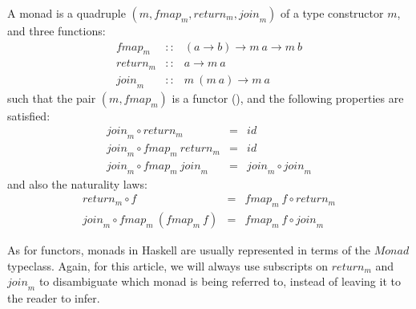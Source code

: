 \begin{definition}\label{defn:monad}
  A monad is a quadruple $(m, \mathit{fmap}_m, \mathit{return}_m,
  \mathit{join}_m)$ of a type constructor $m$, and three functions:
  \begin{displaymath}
    \begin{array}{rcl}
      \mathit{fmap}_m   & :: & (a \to b) \to m~a \to m~b \\
      \mathit{return}_m & :: & a \to m~a \\
      \mathit{join}_m   & :: & m~(m~a) \to m~a
    \end{array}
  \end{displaymath}
  such that the pair $(m, \mathit{fmap}_m)$ is a functor
  (), and the following properties are satisfied:
  \begin{eqnarray}
    \label{eq:monad-join-return}
    \mathit{join}_m \circ \mathit{return}_m & = & \mathit{id} \\
    \label{eq:monad-join-fmap-return}
    \mathit{join}_m \circ \mathit{fmap}_m~\mathit{return}_m & = & \mathit{id} \\
    \label{eq:monad-join-join}
    \mathit{join}_m \circ \mathit{fmap}_m~\mathit{join}_m & = & \mathit{join}_m \circ \mathit{join}_m
  \end{eqnarray}
  and also the naturality laws:
  \begin{eqnarray}
    \label{eq:monad-return-natural}
    \mathit{return}_m \circ f & = & \mathit{fmap}_m~f \circ \mathit{return}_m \\
    \label{eq:monad-join-natural}
    \mathit{join}_m \circ \mathit{fmap}_m~(\mathit{fmap}_m~f) & = & \mathit{fmap}_m~f \circ \mathit{join}_m
  \end{eqnarray}
\end{definition}

As for functors, monads in Haskell are usually represented in terms of
the $\textit{Monad}$ typeclass. Again, for this article, we will
always use subscripts on $\mathit{return}_m$ and $\mathit{join}_m$ to
disambiguate which monad is being referred to, instead of leaving it
to the reader to infer.



